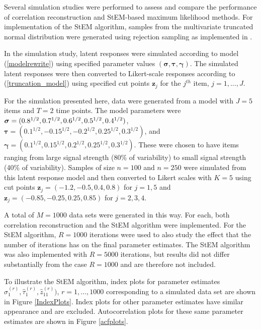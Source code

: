\documentclass[12pt]{article}
\begin{document}
Several simulation studies were performed to assess and compare the
performance of correlation reconstruction and
StEM-based maximum likelihood methods. For implementation of the StEM
algorithm, samples from the multivariate truncated normal distribution were
generated using rejection sampling as implemented in \cite{Botev15}.

In the simulation study, latent responses were simulated according to model (\ref{modelrewrite}) using specified parameter values $(\boldsymbol{\sigma},\boldsymbol{\tau},\boldsymbol{\gamma})$.
The simulated latent responses were then converted to Likert-scale
responses according to (\ref{truncation_model}) using specified cut points $\mathbf{z}_{j}$ for the $j^{th}$ item, $j=1,\ldots,J$.

For the simulation presented here, data were generated from a model with $J = 5$
items and $T=2$ time points. The model parameters were $\boldsymbol{%
\sigma} = (0.8^{1/2}, 0.7^{1/2}, 0.6^{1/2}, 0.5^{1/2}, 0.4^{1/2})$, $\boldsymbol{\tau} = (0.1^{1/2}, -0.15^{1/2},-0.2^{1/2}, 0.25^{1/2}, 0.3^{1/2})$, and $\boldsymbol{\gamma} = (0.1^{1/2}, 0.15^{1/2}, 0.2^{1/2}, 0.25^{1/2}, 0.3^{1/2})$. These were chosen to have items ranging from large signal strength (80\% of variability) to small signal strength (40\% of variability). Samples of size $n=100$ and $n=250$ were simulated from this latent response model and then converted to Likert scales with $K=5$ using cut points $\mathbf{z}_{j}=(-1.2, -0.5, 0.4, 0.8)$ for 
$j=1, 5$ and $\mathbf{z}_{j}=(-0.85, -0.25, 0.25, 0.85)$ for $j= 2, 3, 4$.

 A total of $M=1000$ data sets were generated in this way. For each, both correlation reconstruction and the StEM algorithm were implemented. For the StEM algorithm, $R = 1000$ iterations were used to also study the effect that the number of iterations has on the final parameter estimates. The StEM algorithm was also implemented with $R=5000$ iterations, but results did not differ substantially from the case $R=1000$ and are therefore not included.

To illustrate the StEM algorithm, index plots for parameter estimates $\hat{\sigma}_1^{(r)},\hat{\tau}_1^{(r)},\hat{z}_{11}^{(r)})$, $r=1,\ldots,1000$ corresponding to a simulated data set are shown in Figure \ref{IndexPlots}. Index plots for other parameter estimates have similar appearance and are excluded. Autocorrelation plots for these same parameter estimates are shown in Figure \ref{acfplots}.
\end{document}
